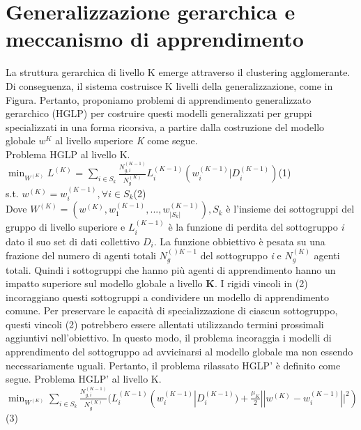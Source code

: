 \section{Generalizzazione gerarchica e meccanismo di apprendimento}

La struttura gerarchica di livello K emerge attraverso il clustering agglomerante. Di conseguenza, il sistema costruisce K livelli della generalizzazione, come in Figura. Pertanto, proponiamo problemi di apprendimento generalizzato gerarchico (HGLP) per costruire questi modelli generalizzati per gruppi specializzati in una forma ricorsiva, a partire dalla costruzione del modello globale $w^K$ al livello superiore \textsl{K} come segue. \\
Problema HGLP al livello K.\vspace{0.5cm}\\

$\min_{W^{(K)}}L^{(K)}$ = $\sum_{i\in S_k} \frac{N_{g,i}^{(K-1)}}{N_g^{(K)}}L_i^{(K-1)}(w_i^{(K-1)}|D_i^{(K-1)})$\hfill(1)\vspace{0.5cm} \\
s.t. $w^{(K)}=w_i^{(K-1)}, \forall i \in S_k$\hfill(2)\vspace{0.5cm} \\

Dove $W^{(K)}=(w^{(K)},w_1^{(K-1)},...,w_{|S_k|}^{(K-1)}), S_k$ è l'insieme dei sottogruppi del gruppo di livello superiore e $L_i^{(K-1)}$ è la funzione di perdita del sottogruppo \textsl{i} dato il suo set di dati collettivo $D_i$. La funzione obbiettivo è pesata su una frazione del numero di agenti totali $N_g^{()K-1}$ del sottogruppo \textsl{i} e $N_g^{(K)}$ agenti totali. Quindi i sottogruppi che hanno più agenti di apprendimento hanno un impatto superiore sul modello globale a livello \textbf{K}. I rigidi vincoli in (2) incoraggiano questi sottogruppi a condividere un modello di apprendimento comune. Per preservare le capacità di specializzazione di ciascun sottogruppo, questi vincoli (2) potrebbero essere allentati utilizzando termini prossimali aggiuntivi nell'obiettivo.
In questo modo, il problema incoraggia i modelli di apprendimento del sottogruppo ad avvicinarsi al modello globale ma non essendo necessariamente uguali. Pertanto, il problema rilassato HGLP' è definito come segue.
Problema HGLP' al livello K.\\

$\min_{W^{(K)}}\sum_{i\in S_k} \frac{N_{g,i}^{(K-1)}}{N_g^{(K)}}(L_i^{(K-1)}(w_i^{(K-1)}|D_i^{(K-1)}) +\frac{\mu_K}{2}||w^{(K)}-w_i^{(K-1)}||^2) $\hfill(3)\\

